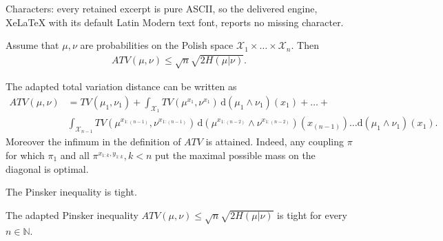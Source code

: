 \documentclass[10pt,a4paper]{amsart}
\newcommand{\X}{\mathcal X}
\begin{document}
Characters: every retained excerpt is pure ASCII, so the delivered engine, XeLaTeX with its default Latin Modern text font, reports no missing character.
\begin{theorem}\label{thm:MainTheorem}
  Assume that $\mu, \nu$ are probabilities on the Polish space $\X_1\times \ldots \times \X_n$. Then
  \begin{align}\label{eq:AP} 
  ATV(\mu, \nu)\leq \sqrt{n}\sqrt{2H(\mu|\nu)}.\end{align}
\end{theorem}

\begin{lemma}\label{le:ATVsimple}
   The adapted total variation distance can be written as
    \begin{align*}
        ATV(\mu,\nu) & = TV(\mu_1,\nu_1) + \int_{\X_1} TV(\mu^{x_1}, \nu^{x_1}) \, \mathrm{d}(\mu_1 \wedge \nu_1)(x_1) + \ldots + \\
        & \int_{\X_{n-1}} TV(\mu^{x_{1:(n-1)}},\nu^{x_{1:(n-1)}}) \, \mathrm{d}(\mu^{x_{1:(n-2)}} \wedge \nu^{x_{1:(n-2)}})(x_{(n-1)}) \ldots \mathrm{d}(\mu_1 \wedge \nu_1)(x_1).
    \end{align*}
    Moreover the infimum in the definition of $ATV$ is attained.
    Indeed, any coupling $\pi$ for which $\pi_1$ and all $ \pi^{x_{1:k},y_{1:k}}, k< n$ put the maximal possible mass on the diagonal is optimal. 
\end{lemma}

\begin{lemma}\label{tightpinsker}
    The Pinsker inequality is tight.
\end{lemma}

\begin{corollary}\label{cor:PinskerTight}
    The adapted Pinsker inequality $ATV(\mu,\nu) \leq \sqrt{n} \sqrt{2 H(\mu|\nu)}$ is tight for every $n \in \mathbb{N}$. %
\end{corollary}
\end{document}
